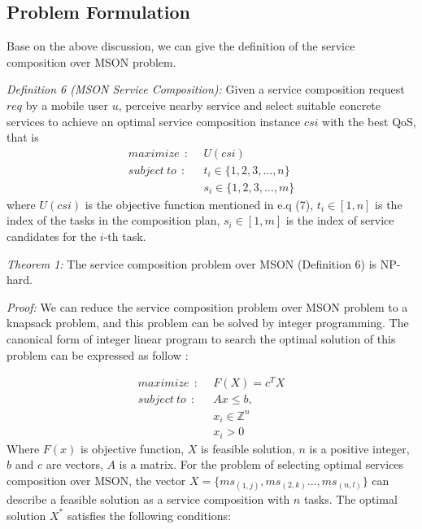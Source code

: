 \documentclass[10pt,journal,compsoc]{IEEEtran}
\begin{document}
\subsection{Problem Formulation}
Base on the above discussion, we can give the definition of the service composition over MSON problem.

\textit{Definition 6 (MSON Service Composition):} Given a service composition request $req$ by a mobile user $u$, perceive nearby service and select suitable concrete services to achieve an optimal service composition instance $csi$ with the best QoS, that is
\begin{align}
maximize      \ \ : \ \ & U(csi)   \\\nonumber
subject\ to   \ \ : \ \ & t_i \in \{1,2,3,...,n\}  \\\nonumber
                        & s_i \in \{1,2,3,...,m \}
\end{align}
where $U(csi)$ is the objective function mentioned in e.q (7), $t_i \in [1,n]$ is the index of the tasks in the composition plan, $s_i \in [1, m]$ is the index of service candidates for the $i$-th task.

\textit{Theorem 1:} The service composition problem over MSON (Definition 6) is NP-hard.

\textit{Proof:} We can reduce the service composition problem over MSON problem to a knapsack problem, and this problem can be solved by integer programming. 
The canonical form of integer linear program to search the optimal solution of this problem can be expressed as follow \cite{papadimitriou1998combinatorial}:\

\begin{align}
maximize     \ \ : \ \ & F(X) = c^{T}X     \\\nonumber
subject\ to  \ \ : \ \ & Ax \le b, \\\nonumber
               	       & x_i \in \mathbb{Z}^{n} \\\nonumber
                       & x_i > 0 
\end{align}
Where $F(x)$ is objective function, $X$ is feasible solution, $n$ is a positive integer, $b$ and $c$ are vectors, $A$ is a matrix.
For the problem of selecting optimal services composition over MSON, the vector $X = \{ms_{(1,j)}, ms_{(2,k)}. . . , ms_{(n,l)}\}$ can describe a feasible solution as a service composition with $n$ tasks. 
The optimal solution  $X^*$ satisfies the following conditions:
\end{document}
